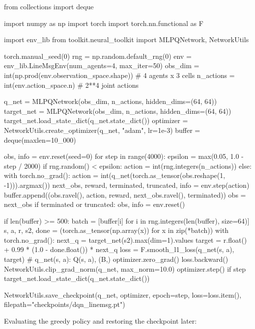\begin{pycode}
from collections import deque

import numpy as np
import torch
import torch.nn.functional as F

import env_lib
from toolkit.neural_toolkit import MLPQNetwork, NetworkUtils

torch.manual_seed(0)
rng = np.random.default_rng(0)
env = env_lib.LineMsgEnv(num_agents=4, max_iter=50)
obs_dim = int(np.prod(env.observation_space.shape))    # 4 agents x 3 cells
n_actions = int(env.action_space.n)                     # 2**4 joint actions

q_net = MLPQNetwork(obs_dim, n_actions, hidden_dims=(64, 64))
target_net = MLPQNetwork(obs_dim, n_actions, hidden_dims=(64, 64))
target_net.load_state_dict(q_net.state_dict())
optimizer = NetworkUtils.create_optimizer(q_net, "adam", lr=1e-3)
buffer = deque(maxlen=10_000)

obs, info = env.reset(seed=0)
for step in range(4000):
    epsilon = max(0.05, 1.0 - step / 2000)
    if rng.random() < epsilon:
        action = int(rng.integers(n_actions))
    else:
        with torch.no_grad():
            action = int(q_net(torch.as_tensor(obs.reshape(1, -1))).argmax())
    next_obs, reward, terminated, truncated, info = env.step(action)
    buffer.append((obs.ravel(), action, reward, next_obs.ravel(), terminated))
    obs = next_obs
    if terminated or truncated:
        obs, info = env.reset()

    if len(buffer) >= 500:
        batch = [buffer[i] for i in rng.integers(len(buffer), size=64)]
        s, a, r, s2, done = (torch.as_tensor(np.array(x)) for x in zip(*batch))
        with torch.no_grad():
            next_q = target_net(s2).max(dim=1).values
            target = r.float() + 0.99 * (1.0 - done.float()) * next_q
        loss = F.smooth_l1_loss(q_net(s, a), target)   # q_net(s, a): Q(s, a), (B,)
        optimizer.zero_grad()
        loss.backward()
        NetworkUtils.clip_grad_norm(q_net, max_norm=10.0)
        optimizer.step()
    if step %
        target_net.load_state_dict(q_net.state_dict())

NetworkUtils.save_checkpoint(q_net, optimizer, epoch=step, loss=loss.item(),
                             filepath="checkpoints/dqn_linemsg.pt")
\end{pycode}

Evaluating the greedy policy and restoring the checkpoint later:


